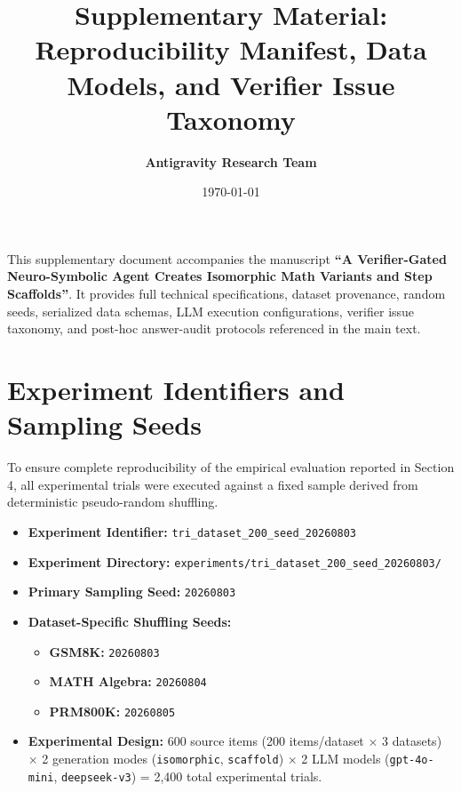 \documentclass[11pt,letterpaper]{article}
\title{\textbf{Supplementary Material: Reproducibility Manifest, Data Models, and Verifier Issue Taxonomy}}
\author{\textbf{Antigravity Research Team}}
\date{\today}
\begin{document}
\maketitle

This supplementary document accompanies the manuscript \textbf{``A Verifier-Gated Neuro-Symbolic Agent Creates Isomorphic Math Variants and Step Scaffolds''}. It provides full technical specifications, dataset provenance, random seeds, serialized data schemas, LLM execution configurations, verifier issue taxonomy, and post-hoc answer-audit protocols referenced in the main text.

\tableofcontents
\newpage

\section{Experiment Identifiers and Sampling Seeds}\label{sec:experiment-identifiers}

To ensure complete reproducibility of the empirical evaluation reported in Section 4, all experimental trials were executed against a fixed sample derived from deterministic pseudo-random shuffling.

\begin{itemize}
    \item \textbf{Experiment Identifier:} \texttt{tri\_dataset\_200\_seed\_20260803}
    \item \textbf{Experiment Directory:} \texttt{experiments/tri\_dataset\_200\_seed\_20260803/}
    \item \textbf{Primary Sampling Seed:} \texttt{20260803}
    \item \textbf{Dataset-Specific Shuffling Seeds:}
    \begin{itemize}
        \item \textbf{GSM8K:} \texttt{20260803}
        \item \textbf{MATH Algebra:} \texttt{20260804}
        \item \textbf{PRM800K:} \texttt{20260805}
    \end{itemize}
    \item \textbf{Experimental Design:} 600 source items (200 items/dataset $\times$ 3 datasets) $\times$ 2 generation modes (\texttt{isomorphic}, \texttt{scaffold}) $\times$ 2 LLM models (\texttt{gpt-4o-mini}, \texttt{deepseek-v3}) = 2,400 total experimental trials.
\end{itemize}
\end{document}
